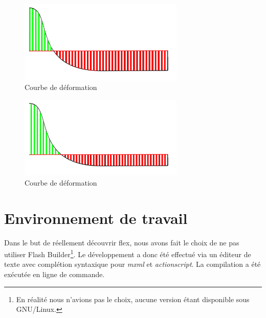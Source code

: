 \begin{figure}[H]
  \centering
  \includegraphics[width=0.7\textwidth]{../resources/illustrations/js_4}
  \caption{Courbe de déformation}
\end{figure}

\begin{figure}[H]
  \centering
  \includegraphics[width=0.7\textwidth]{../resources/illustrations/js_5}
  \caption{Courbe de déformation}
\end{figure}

\section{Environnement de travail}

Dans le but de réellement découvrir flex, nous avons fait le choix de ne pas utiliser Flash Builder\footnote{En réalité nous n'avions pas le choix, aucune version étant disponible sous GNU/Linux.}. Le développement a donc été effectué via un éditeur de texte avec complétion syntaxique pour \emph{mxml} et \emph{actionscript}. La compilation a été exécutée en ligne de commande.
